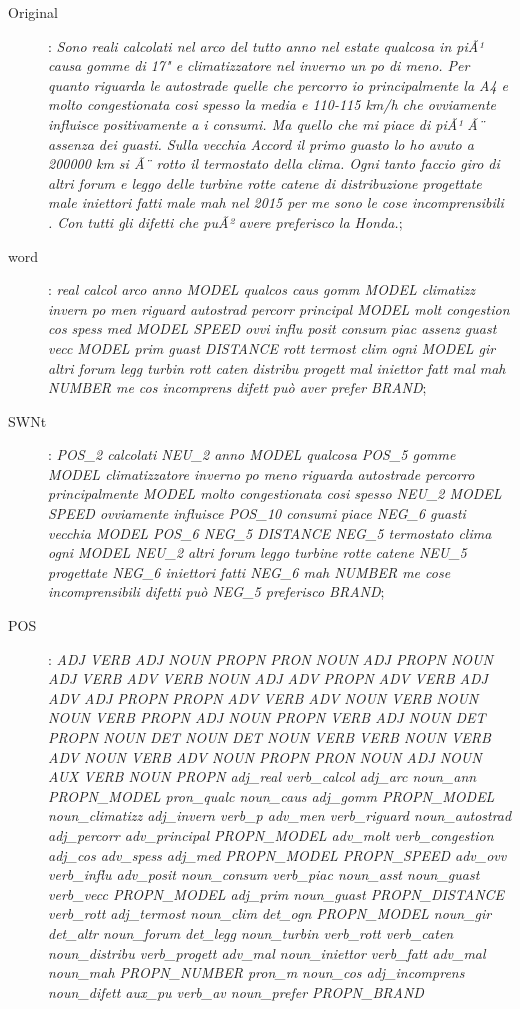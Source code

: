 \begin{description}
	\item[Original]: \textit{Sono reali calcolati nel arco del tutto anno nel estate qualcosa in piÃ¹ causa gomme di 17" e climatizzatore nel inverno un po di meno. Per quanto riguarda le autostrade quelle che percorro io principalmente la A4 e molto congestionata cosi spesso la media e 110-115 km/h che ovviamente influisce positivamente a i consumi. Ma quello che mi piace di piÃ¹ Ã¨ assenza dei guasti. Sulla vecchia Accord il primo guasto lo ho avuto a 200000 km si Ã¨ rotto il termostato della clima. Ogni tanto faccio giro di altri forum e leggo delle turbine rotte catene di distribuzione progettate male iniettori fatti male mah nel 2015 per me sono le cose incomprensibili . Con tutti gli difetti che puÃ² avere preferisco la Honda.};
	\item[word]: \textit{real calcol arco anno MODEL qualcos caus gomm MODEL climatizz invern po men riguard autostrad percorr principal MODEL molt congestion cos spess med MODEL SPEED ovvi influ posit consum piac assenz guast vecc MODEL prim guast DISTANCE rott termost clim ogni MODEL gir altri forum legg turbin rott caten distribu progett mal iniettor fatt mal mah NUMBER me cos incomprens difett può aver prefer BRAND};
	\item[SWNt]: \textit{POS\_2 calcolati NEU\_2 anno MODEL qualcosa POS\_5 gomme MODEL climatizzatore inverno po meno riguarda autostrade percorro principalmente MODEL molto congestionata cosi spesso NEU\_2 MODEL SPEED ovviamente influisce POS\_10 consumi piace NEG\_6 guasti vecchia MODEL POS\_6 NEG\_5 DISTANCE NEG\_5 termostato clima ogni MODEL NEU\_2 altri forum leggo turbine rotte catene NEU\_5 progettate NEG\_6 iniettori fatti NEG\_6 mah NUMBER me cose incomprensibili difetti può NEG\_5 preferisco BRAND};
	\item[POS]: \textit{ADJ VERB ADJ NOUN PROPN PRON NOUN ADJ PROPN NOUN ADJ VERB ADV VERB NOUN ADJ ADV PROPN ADV VERB ADJ ADV ADJ PROPN PROPN ADV VERB ADV NOUN VERB NOUN NOUN VERB PROPN ADJ NOUN PROPN VERB ADJ NOUN DET PROPN NOUN DET NOUN DET NOUN VERB VERB NOUN VERB ADV NOUN VERB ADV NOUN PROPN PRON NOUN ADJ NOUN AUX VERB NOUN PROPN adj\_real verb\_calcol adj\_arc noun\_ann PROPN\_MODEL pron\_qualc noun\_caus adj\_gomm PROPN\_MODEL noun\_climatizz adj\_invern verb\_p adv\_men verb\_riguard noun\_autostrad adj\_percorr adv\_principal PROPN\_MODEL adv\_molt verb\_congestion adj\_cos adv\_spess adj\_med PROPN\_MODEL PROPN\_SPEED adv\_ovv verb\_influ adv\_posit noun\_consum verb\_piac noun\_asst noun\_guast verb\_vecc PROPN\_MODEL adj\_prim noun\_guast PROPN\_DISTANCE verb\_rott adj\_termost noun\_clim det\_ogn PROPN\_MODEL noun\_gir det\_altr noun\_forum det\_legg noun\_turbin verb\_rott verb\_caten noun\_distribu verb\_progett adv\_mal noun\_iniettor verb\_fatt adv\_mal noun\_mah PROPN\_NUMBER pron\_m noun\_cos adj\_incomprens noun\_difett aux\_pu verb\_av noun\_prefer PROPN\_BRAND} 
\end{description}


